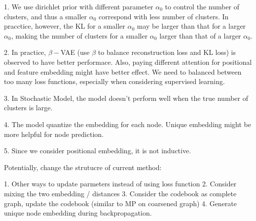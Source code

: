 \documentclass[12pt]{amsart}
\begin{document}
1. We use dirichlet prior with different parameter $\alpha_0$ to control the number of clusters, and thus a smaller $\alpha_0$ correspond with less number of clusters. 
In pracctice, however, the KL for a smaller $\alpha_0$ may be larger than that for a larger $\alpha_0$, making the number of clusters for a smaller $\alpha_0$ larger than that of a larger $\alpha_0$.

2. In practice, $\beta-$VAE (use $\beta$ to balance reconstruction loss and KL loss) is observed to have better performace. 
Also, paying different attention for positional and feature embedding might have better effect. We need to balanced between too many loss functions, especially when considering supervised learning.

3. In Stochastic Model, the model doesn't perform well when the true number of clusters is large. 

4. The model quantize the embedding for each node. Unique embedding might be more helpful for node prediction.

5. Since we consider positional embedding, it is not inductive.

Potentially, change the strutucre of current method:

1. Other ways to update parmeters instead of using loss function 
2. Consider mixing the two embedding / distances
3. Consider the codebook as complete graph, update the codebook (similar to MP on coarsened graph)
4. Generate unique node embedding during backpropagation.
\end{document}
